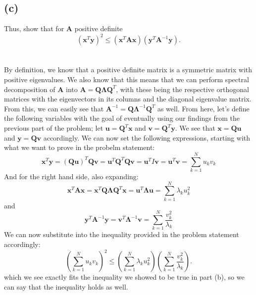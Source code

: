 \documentclass{article}
\begin{document}
{\subsection*{(c)}
Thus, show that for \(\mathbf{A}\) positive definite
\[
  (\mathbf{x}^T \mathbf{y})^2 \leq (\mathbf{x}^T \mathbf{Ax}) (\mathbf{y}^T \mathbf{A}^{-1} \mathbf{y}).
\] \\ \\
By definition, we know that a positive definite matrix is a symmetric matrix with positive eigenvalues. We also know that this means that we can perform spectral decomposition of \(\mathbf{A}\) into \(\mathbf{A} = \mathbf{Q} \mathbf{\Lambda} \mathbf{Q}^T\), with these being the respective orthogonal matrices with the  eigenvectors in its columns and the diagonal eigenvalue matrix. From this, we can easily see that \(\mathbf{A}^{-1} = \mathbf{Q} \mathbf{\Lambda}^{-1} \mathbf{Q}^T\) as well. From here, let's define the following variables with the goal of eventually using our findings from the previous part of the problem; let \(\mathbf{u} = \mathbf{Q}^T \mathbf{x}\) and \(\mathbf{v} = \mathbf{Q}^T \mathbf{y}\). We see that \(\mathbf{x} = \mathbf{Q}\mathbf{u} \) and \(\mathbf{y} = \mathbf{Q} \mathbf{v}\) accordingly. We can now set the following expressions, starting with what we want to prove in the probelm statement:
\[
  \mathbf{x}^T \mathbf{y} = (\mathbf{Q}\mathbf{u})^T \mathbf{Q}\mathbf{v} = \mathbf{u}^T \mathbf{Q}^T \mathbf{Q}\mathbf{v} = \mathbf{u}^T I \mathbf{v} = \mathbf{u}^T \mathbf{v} = \sum_{k=1}^{N} u_k v_k
\]
And for the right hand side, also expanding:
\[
  \mathbf{x}^T \mathbf{A} \mathbf{x} = \mathbf{x}^T \mathbf{Q} \mathbf{\Lambda} \mathbf{Q}^T \mathbf{x} = \mathbf{u}^T \mathbf{\Lambda} \mathbf{u} = \sum_{k=1}^{N} \lambda_k u_k^2
\]
and 
\[
  \mathbf{y}^T \mathbf{A}^{-1} \mathbf{y} = \mathbf{v}^T \mathbf{\Lambda}^{-1} \mathbf{v} = \sum_{k=1}^{N} \frac{v_k^2}{\lambda_k}
\]
We can now substitute into the inequality provided in the problem statement accordingly:
\[
  (\sum_{k=1}^{N} u_k v_k)^2 \leq (\sum_{k=1}^{N} \lambda_k u_k^2) (\sum_{k=1}^{N} \frac{v_k^2}{\lambda_k}).
\]
which we see exactly fits the inequality we showed to be true in part (b), so we can say that the inequality holds as well.

}
\end{document}

